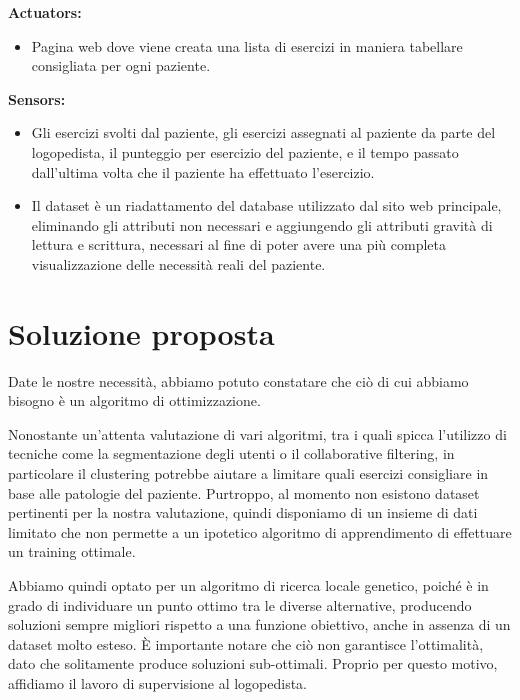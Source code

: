 \documentclass{article}
\begin{document}
    \textbf{Actuators:}

    \begin{itemize}
        \item Pagina web dove viene creata una lista di esercizi in maniera tabellare consigliata per ogni paziente.
    \end{itemize}

    \textbf{Sensors:}

    \begin{itemize}
        \item Gli esercizi svolti dal paziente, gli esercizi assegnati al paziente da parte del logopedista, il punteggio per esercizio del paziente, e il tempo passato dall'ultima volta che il paziente ha effettuato l'esercizio.

        \item Il dataset è un riadattamento del database utilizzato dal sito web principale, eliminando gli attributi non necessari e aggiungendo gli attributi gravità di lettura e scrittura, necessari al fine di poter avere una più completa visualizzazione delle necessità reali del paziente.

    \end{itemize}
    \pagebreak
    \section{Soluzione proposta}

    Date le nostre necessità, abbiamo potuto constatare che ciò di cui abbiamo bisogno è un algoritmo di ottimizzazione.

    Nonostante un'attenta valutazione di vari algoritmi, tra i quali spicca l'utilizzo di tecniche come la segmentazione degli utenti o il collaborative filtering,
    in particolare il clustering potrebbe aiutare a limitare quali esercizi consigliare in base alle patologie del paziente. Purtroppo, al momento non esistono
    dataset pertinenti per la nostra valutazione, quindi disponiamo di un insieme di dati limitato che non permette a un ipotetico algoritmo di apprendimento di
    effettuare un training ottimale.

    Abbiamo quindi optato per un algoritmo di ricerca locale genetico, poiché è in grado di individuare un punto ottimo tra le diverse alternative, producendo
    soluzioni sempre migliori rispetto a una funzione obiettivo, anche in assenza di un dataset molto esteso. È importante notare che ciò non garantisce l'ottimalità,
    dato che solitamente produce soluzioni sub-ottimali. Proprio per questo motivo, affidiamo il lavoro di supervisione al logopedista.
\end{document}
